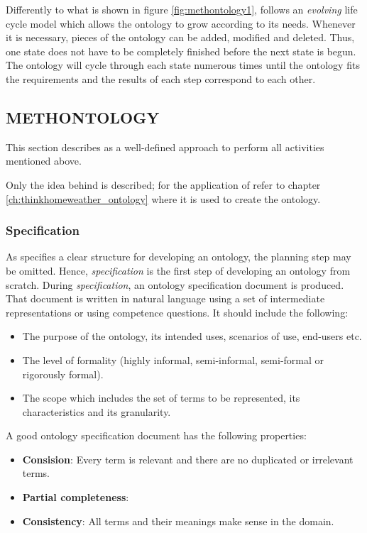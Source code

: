 Differently to what is shown in figure \ref{fig:methontology1}, \methontology follows an \emph{evolving} life cycle model which allows the ontology to grow according to its needs. Whenever it is necessary, pieces of the ontology can be added, modified and deleted. Thus, one state does not have to be completely finished before the next state is begun. The ontology will cycle through each state numerous times until the ontology fits the requirements and the results of each step correspond to each other.

\subsection{METHONTOLOGY}

This section describes \methontology as a well-defined approach to perform all activities mentioned above.

Only the idea behind \methontology is described; for the application of \methontology refer to chapter \ref{ch:thinkhomeweather_ontology} where it is used to create the \thinkhomeweather ontology.

\subsubsection{Specification}

As \methontology specifies a clear structure for developing an ontology, the planning step may be omitted. Hence, \emph{specification} is the first step of developing an ontology from scratch. During \emph{specification}, an ontology specification document is produced. That document is written in natural language using a set of intermediate representations or using competence questions. It should include the following:

\begin{itemize}
  \item The purpose of the ontology, its intended uses, scenarios of use, end-users etc.
  \item The level of formality (highly informal, semi-informal, semi-formal or rigorously formal). %
  \item The scope which includes the set of terms to be represented, its characteristics and its granularity.
\end{itemize}

A good ontology specification document has the following properties:

\begin{itemize}
  \item \textbf{Consision}: Every term is relevant and there are no duplicated or irrelevant terms.
  \item \textbf{Partial completeness}: %
  \item \textbf{Consistency}: All terms and their meanings make sense in the domain.
\end{itemize}

